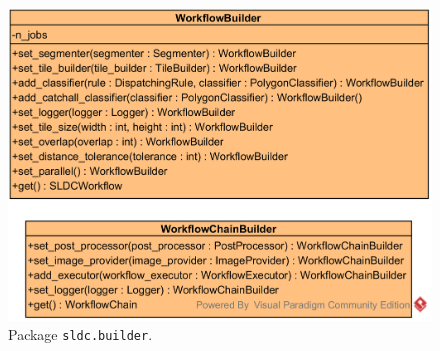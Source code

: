 \begin{figure}
	\center
	\includegraphics[scale=0.75]{image/uml_builder.png}
	\caption{Package \texttt{sldc.builder}.}
	\label{fig:uml_builder}
\end{figure}
 
